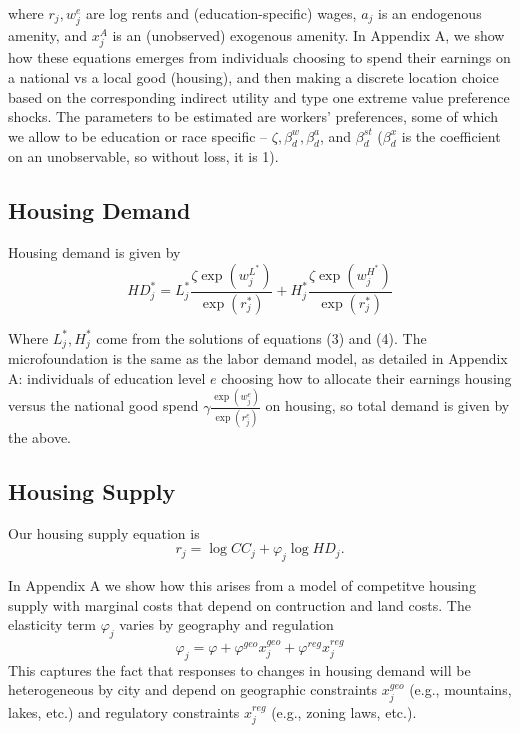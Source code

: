 \documentclass{article}
\begin{document}
where $r_j, w_j^e$ are log rents and (education-specific) wages, $a_j$ is an endogenous amenity, and $x_j^{A}$ is an (unobserved) exogenous amenity. In Appendix A, we show how  these equations emerges from individuals choosing to spend their earnings on a national vs a local good (housing), and then making a discrete location choice based on the corresponding indirect utility and type one extreme value preference shocks. The parameters to be estimated are workers' preferences, some of which we allow to be education or race specific -- $\zeta, \beta_d^w, \beta_d^a$, and $\beta_d^{st}$ ($\beta_d^x$ is the coefficient on an unobservable, so without loss, it is 1).  

\subsection{Housing Demand}
Housing demand is given by 
\begin{equation} \label{eq: housing demand}  HD_{j}^* = L_{j}^* \frac{\zeta \exp(w_{j}^{L^*})}{\exp(r_{j}^*)} + H_{j}^* \frac{\zeta \exp(w_{j}^{H^*})}{\exp(r_{j}^*)} 
\end{equation}

Where $L_j^*, H_j^*$ come from the solutions of equations (3) and (4). The microfoundation is the same as the labor demand model, as detailed in Appendix A: individuals of education level $e$ choosing how to allocate their earnings housing versus the national good spend $\gamma \frac{\exp(w_j^e)}{\exp(r_j^e)}$ on housing, so total demand is given by the above. 



\subsection{Housing Supply}

Our housing supply equation is \begin{equation}\label{eq: housing supply}
    r_{j} = \log CC_{j} + \varphi_j \log HD_{j}.
\end{equation}

In Appendix A we show how this arises from a model of competitve housing supply with marginal costs that depend on contruction and land costs. The elasticity term $\varphi_j$ varies by geography and regulation
$$\varphi_j = \varphi + \varphi^{geo}x_j^{geo} + \varphi^{reg} x_j^{reg}$$
This captures the fact that responses to changes in housing demand will be heterogeneous by city and depend on geographic constraints $x_j^{geo}$ (e.g., mountains, lakes, etc.) and regulatory constraints $x_j^{reg}$ (e.g., zoning laws, etc.). 
\end{document}
